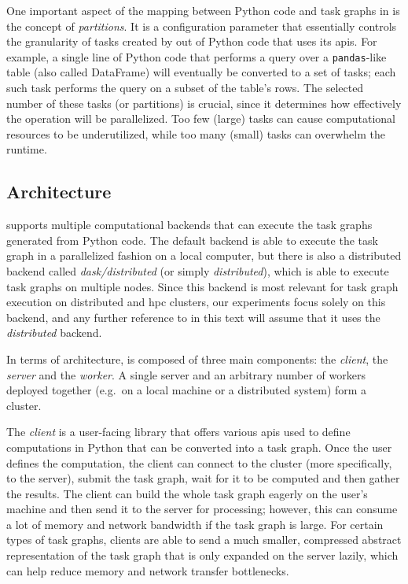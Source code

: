 One important aspect of the mapping between Python code and task graphs in
\dask{} is the concept of \emph{partitions}. It is a configuration
parameter that essentially controls the granularity of tasks created by \dask{}
out of Python code that uses its \glspl{api}. For example, a single line of Python
code that performs a query over a \texttt{pandas}-like table (also called DataFrame)
will eventually be converted to a set of tasks; each such task performs the query on a subset of
the table's rows. The selected number of these tasks (or partitions) is crucial, since it
determines how effectively the operation will be parallelized. Too few (large) tasks can cause
computational resources to be underutilized, while too many (small) tasks can overwhelm the
\dask{} runtime.

\subsection*{Architecture}
\dask{} supports multiple computational backends that can execute the task
graphs generated from Python code. The default backend is able to execute the task graph in a
parallelized fashion on a local computer, but there is also a distributed backend called
\emph{dask/distributed}
(or simply \emph{distributed}), which is able to execute task graphs on
multiple nodes. Since this backend is most relevant for task graph execution on distributed and
\gls{hpc} clusters, our experiments focus solely on this backend, and any further
reference to \dask{} in this text will assume that it uses the
\emph{distributed} backend.

In terms of architecture, \dask{} is composed of three main components: the
\emph{client}, the \emph{server} and the \emph{worker}. A
single server and an arbitrary number of workers deployed together (e.g.\ on a local machine or a
distributed system) form a \dask{} cluster.

The \emph{client} is a user-facing library that offers various
\glspl{api} used to define computations in Python that can be converted into a task
graph. Once the user defines the computation, the client can connect to the
\dask{} cluster (more specifically, to the server), submit the task graph, wait
for it to be computed and then gather the results. The client can build the whole task graph
eagerly on the user's machine and then send it to the server for processing; however, this can
consume a lot of memory and network bandwidth if the task graph is large. For certain types of task
graphs, clients are able to send a much smaller, compressed abstract representation of the task
graph that is only expanded on the server lazily, which can help reduce memory and network transfer
bottlenecks.

